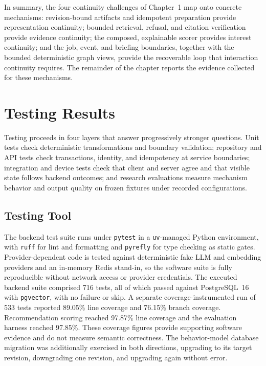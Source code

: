 In summary, the four continuity challenges of Chapter~1 map onto concrete mechanisms: revision-bound artifacts and idempotent preparation provide representation continuity; bounded retrieval, refusal, and citation verification provide evidence continuity; the composed, explainable scorer provides interest continuity; and the job, event, and briefing boundaries, together with the bounded deterministic graph views, provide the recoverable loop that interaction continuity requires.
The remainder of the chapter reports the evidence collected for these mechanisms.

\section{Testing Results}

Testing proceeds in four layers that answer progressively stronger questions.
Unit tests check deterministic transformations and boundary validation; repository and API tests check transactions, identity, and idempotency at service boundaries; integration and device tests check that client and server agree and that visible state follows backend outcomes; and research evaluations measure mechanism behavior and output quality on frozen fixtures under recorded configurations.

\subsection{Testing Tool}

The backend test suite runs under \texttt{pytest} in a \texttt{uv}-managed Python environment, with \texttt{ruff} for lint and formatting and \texttt{pyrefly} for type checking as static gates.
Provider-dependent code is tested against deterministic fake LLM and embedding providers and an in-memory Redis stand-in, so the software suite is fully reproducible without network access or provider credentials.
The executed backend suite comprised 716 tests, all of which passed against
PostgreSQL~16 with \texttt{pgvector}, with no failure or skip.
A separate coverage-instrumented run of 533 tests reported 89.05\% line
coverage and 76.15\% branch coverage. Recommendation scoring reached 97.87\%
line coverage and the evaluation harness reached 97.85\%. These coverage
figures provide supporting software evidence and do not measure semantic
correctness.
The behavior-model database migration was additionally exercised in both directions, upgrading to its target revision, downgrading one revision, and upgrading again without error.

